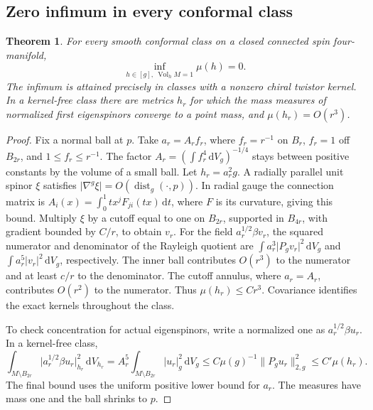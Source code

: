 \documentclass[11pt]{article}
\numberwithin{equation}{section}
\newtheorem{theorem}{Theorem}[section]
\DeclareMathOperator{\Vol}{Vol}
\DeclareMathOperator{\dist}{dist}
\newcommand{\dd}{\mathrm{d}}
\newcommand{\abs}[1]{\lvert #1\rvert}
\newcommand{\norm}[1]{\lVert #1\rVert}
\newcommand{\dv}{\dd V_g}
\begin{document}
\subsection{Zero infimum in every conformal class}

\begin{theorem}\label{thm:twistor-inf}
For every smooth conformal class on a closed connected spin four-manifold,
\[
 \inf_{h\in[g],\ \Vol_h M=1}\mu(h)=0.
\]
The infimum is attained precisely in classes with a nonzero chiral
twistor kernel. In a kernel-free class there are metrics \(h_r\) for
which the mass measures of normalized first eigenspinors converge to
a point mass, and \(\mu(h_r)=O(r^3)\).
\end{theorem}

\begin{proof}
Fix a normal ball at \(p\). Take \(a_r=A_rf_r\), where \(f_r=r^{-1}\)
on \(B_r\), \(f_r=1\) off \(B_{2r}\), and \(1\le f_r\le r^{-1}\).
The factor \(A_r=(\int f_r^4\,\dv)^{-1/4}\) stays between positive
constants by the volume of a small ball. Let \(h_r=a_r^2g\).
A radially parallel unit spinor \(\xi\) satisfies
\(\abs{\nabla^g\xi}=O(\dist_g(\cdot,p))\). In radial gauge the
connection matrix is
\(A_i(x)=\int_0^1 t x^j F_{ji}(tx)\,\dd t\), where \(F\) is its
curvature, giving this bound. Multiply \(\xi\) by a cutoff equal to
one on \(B_{2r}\), supported in \(B_{4r}\), with gradient bounded by
\(C/r\), to obtain \(v_r\). For the field \(a_r^{1/2}\beta v_r\),
the squared numerator and denominator of the Rayleigh quotient
are \(\int a_r^3\abs{P_gv_r}^2\,\dv\) and
\(\int a_r^5\abs{v_r}^2\,\dv\), respectively. The inner ball
contributes \(O(r^3)\) to the numerator and at least \(c/r\) to
the denominator. The cutoff annulus, where \(a_r=A_r\), contributes
\(O(r^2)\) to the numerator. Thus \(\mu(h_r)\le Cr^3\).
Covariance identifies the exact kernels throughout the class.

To check concentration for actual eigenspinors, write a normalized
one as \(a_r^{1/2}\beta u_r\). In a kernel-free class,
\[
 \int_{M\setminus B_{2r}}\abs{a_r^{1/2}\beta u_r}_{h_r}^2\,\dd V_{h_r}
  = A_r^5\int_{M\setminus B_{2r}}\abs{u_r}_g^2\,\dv
  \le C\mu(g)^{-1}\norm{P_gu_r}_{2,g}^2
  \le C'\mu(h_r).
\]
The final bound uses the uniform positive lower bound for \(a_r\).
The measures have mass one and the ball shrinks to \(p\).
\end{proof}
\end{document}
